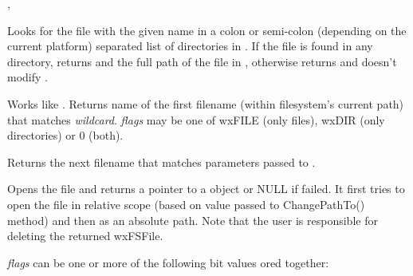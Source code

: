,


\label{wxfilesystemfindfileinpath}


Looks for the file with the given name  in a colon or semi-colon
(depending on the current platform) separated list of directories in
. If the file is found in any directory, returns \true and the full
path of the file in , otherwise returns \false and doesn't modify 
.






\label{wxfilesystemfindfirst}


Works like . Returns name of the first
filename (within filesystem's current path) that matches {\it wildcard}. {\it flags} may be one of
wxFILE (only files), wxDIR (only directories) or 0 (both).


\label{wxfilesystemfindnext}


Returns the next filename that matches parameters passed to .


\label{wxfilesystemopenfile}


Opens the file and returns a pointer to a  object
or NULL if failed. It first tries to open the file in relative scope
(based on value passed to ChangePathTo() method) and then as an
absolute path.  Note that the user is responsible for deleting the returned
wxFSFile.  

{\it flags} can be one or more of the following bit values ored together:


